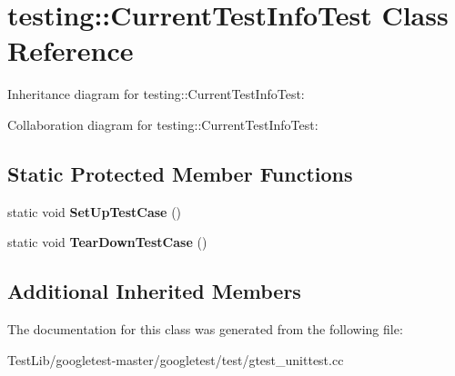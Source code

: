 \hypertarget{classtesting_1_1CurrentTestInfoTest}{}\section{testing\+:\+:Current\+Test\+Info\+Test Class Reference}
\label{classtesting_1_1CurrentTestInfoTest}


Inheritance diagram for testing\+:\+:Current\+Test\+Info\+Test\+:


Collaboration diagram for testing\+:\+:Current\+Test\+Info\+Test\+:
\subsection*{Static Protected Member Functions}
\begin{DoxyCompactItemize}
\item 
\mbox{\label{classtesting_1_1CurrentTestInfoTest_a61bad7ce29923afd464daf9684b6269e}} 
static void {\bfseries Set\+Up\+Test\+Case} ()
\item 
\mbox{\label{classtesting_1_1CurrentTestInfoTest_a9a80a5a3e6e70c619870c2ae9df892a6}} 
static void {\bfseries Tear\+Down\+Test\+Case} ()
\end{DoxyCompactItemize}
\subsection*{Additional Inherited Members}


The documentation for this class was generated from the following file\+:\begin{DoxyCompactItemize}
\item 
Test\+Lib/googletest-\/master/googletest/test/gtest\+\_\+unittest.\+cc\end{DoxyCompactItemize}
